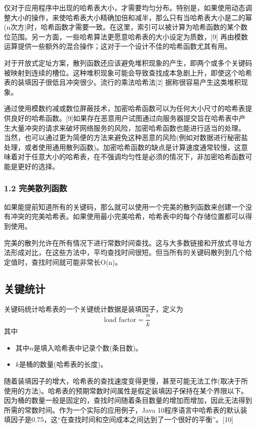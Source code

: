 仅对于应用程序中出现的哈希表大小，才需要均匀分布。特别是，如果使用动态调整大小的操作，来使哈希表大小精确加倍和减半，那么只有当哈希表大小是二的幂(n次方)时，哈希函数才需要一致。在这里，索引可以被计算为哈希函数的某个数位范围。另一方面，一些哈希算法更愿意哈希表的大小设定为质数，[9] 再由模数运算提供一些额外的混合操作；这对于一个设计不佳的哈希函数尤其有用。

对于开放式定址方案，散列函数还应该避免堆积现象的产生，即两个或多个关键码被映射到连续的槽位。这种堆积现象可能会导致查找成本急剧上升，即使这个哈希表的装填因子很低且冲突很少。流行的乘法哈希法[2] 据称很容易产生这类堆积现象。

通过使用模数约减或数位屏蔽技术，加密哈希函数可以为任何大小尺寸的哈希表提供良好的哈希函数。[9]如果存在恶意用户试图通过向服务器提交旨在哈希表中产生大量冲突的请求来破坏网络服务的风险，加密哈希函数也能进行适当的处理。 当然，也可以通过更为简便的方法来避免这种恶意的风险(例如对数据进行秘密盐处理，或者使用通用散列函数)。加密哈希函数的缺点是计算速度通常较慢，这意味着对于任意大小的哈希表，在不强调均匀性是必须的情况下，非加密哈希函数可能是更好的选择。

\subsubsection{1.2 完美散列函数}
如果能提前知道所有的关键码，那么就可以使用一个完美的散列函数来创建一个没有冲突的完美哈希表。如果使用最小完美哈希，哈希表中的每个存储位置都可以得到使用。

完美的散列允许在所有情况下进行常数时间查找。这与大多数链接和开放式寻址方法形成对比，在这些方法中，平均查找时间很短。但当所有的关键码散列到几个给定值时，查找时间就可能非常长O(n)。

\subsection{关键统计}
关键码统计哈希表的一个关键统计数据是装填因子，定义为
\begin{equation}
\text{load factor} = \frac{n}{k}~
\end{equation}
其中
\begin{itemize}
\item 其中$n$是填入哈希表中记录个数(条目数)。
\item $k$是桶的数量(哈希表的长度)。
\end{itemize}
随着装填因子的增大，哈希表的查找速度变得更慢，甚至可能无法工作(取决于所使用的方法)。哈希表的预期常数时间属性是假定装填因子保持在某个界限以下。因为桶的数量一般是固定的，查找时间随着条目数量的增加而增加，因此无法得到所需的常数时间。作为一个实际的应用例子，Java 10程序语言中哈希表的默认装填因子是0.75，这“在查找时间和空间成本之间达到了一个很好的平衡”。[10]


